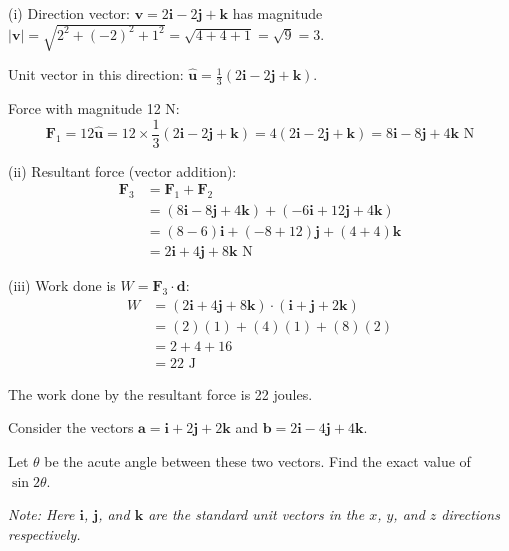 \begin{solution}[Sketch]
(i) Direction vector: $\mathbf{v} = 2\mathbf{i} - 2\mathbf{j} + \mathbf{k}$ has magnitude $|\mathbf{v}| = \sqrt{2^2 + (-2)^2 + 1^2} = \sqrt{4+4+1} = \sqrt{9} = 3$.

Unit vector in this direction: $\hat{\mathbf{u}} = \frac{1}{3}(2\mathbf{i} - 2\mathbf{j} + \mathbf{k})$.

Force with magnitude 12 N: 
$$\mathbf{F}_1 = 12\hat{\mathbf{u}} = 12 \times \frac{1}{3}(2\mathbf{i} - 2\mathbf{j} + \mathbf{k}) = 4(2\mathbf{i} - 2\mathbf{j} + \mathbf{k}) = 8\mathbf{i} - 8\mathbf{j} + 4\mathbf{k} \text{ N}$$

(ii) Resultant force (vector addition): 
\begin{align*}
\mathbf{F}_3 &= \mathbf{F}_1 + \mathbf{F}_2 \\
&= (8\mathbf{i} - 8\mathbf{j} + 4\mathbf{k}) + (-6\mathbf{i} + 12\mathbf{j} + 4\mathbf{k}) \\
&= (8-6)\mathbf{i} + (-8+12)\mathbf{j} + (4+4)\mathbf{k} \\
&= 2\mathbf{i} + 4\mathbf{j} + 8\mathbf{k} \text{ N}
\end{align*}

(iii) Work done is $W = \mathbf{F}_3 \cdot \mathbf{d}$:
\begin{align*}
W &= (2\mathbf{i} + 4\mathbf{j} + 8\mathbf{k}) \cdot (\mathbf{i} + \mathbf{j} + 2\mathbf{k}) \\
&= (2)(1) + (4)(1) + (8)(2) \\
&= 2 + 4 + 16 \\
&= 22 \text{ J}
\end{align*}

The work done by the resultant force is 22 joules.
\end{solution}

\vspace{1em}

\begin{problem}
Consider the vectors $\mathbf{a} = \mathbf{i} + 2\mathbf{j} + 2\mathbf{k}$ and $\mathbf{b} = 2\mathbf{i} - 4\mathbf{j} + 4\mathbf{k}$. 

Let $\theta$ be the acute angle between these two vectors. Find the exact value of $\sin 2\theta$.

\textit{Note: Here $\mathbf{i}$, $\mathbf{j}$, and $\mathbf{k}$ are the standard unit vectors in the $x$, $y$, and $z$ directions respectively.}
\end{problem}

